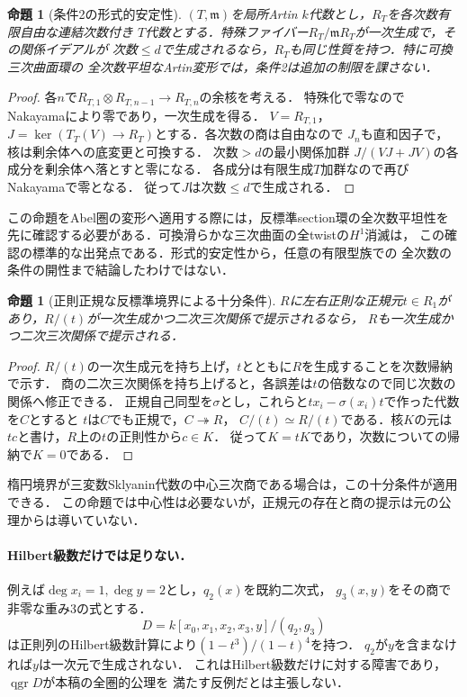 \documentclass[11pt,a4paper]{ltjsarticle}
\newtheorem{proposition}[theorem]{命題}
\theoremstyle{definition}\newtheorem{definition}[theorem]{定義}
\newcommand{\qgr}{\operatorname{qgr}}\newcommand{\Gr}{\operatorname{Gr}}
\begin{document}
\begin{proposition}[条件2の形式的安定性]\label{prop:artin}
$(T,\mathfrak m)$を局所Artin $k$代数とし，$R_T$を各次数有限自由な連結次数付き
$T$代数とする．特殊ファイバー$R_T/\mathfrak mR_T$が一次生成で，その関係イデアルが
次数$\le d$で生成されるなら，$R_T$も同じ性質を持つ．特に可換三次曲面環の
全次数平坦なArtin変形では，条件2は追加の制限を課さない．
\end{proposition}
\begin{proof}
各$n$で$R_{T,1}\otimes R_{T,n-1}\to R_{T,n}$の余核を考える．
特殊化で零なのでNakayamaにより零であり，一次生成を得る．
$V=R_{T,1}$，$J=\ker(T_T(V)\to R_T)$とする．各次数の商は自由なので
$J_n$も直和因子で，核は剰余体への底変更と可換する．
次数$>d$の最小関係加群
$J/(VJ+JV)$の各成分を剰余体へ落とすと零になる．
各成分は有限生成$T$加群なので再びNakayamaで零となる．
従って$J$は次数$\le d$で生成される．
\end{proof}
この命題をAbel圏の変形へ適用する際には，反標準section環の全次数平坦性を
先に確認する必要がある．可換滑らかな三次曲面の全twistの$H^1$消滅は，
この確認の標準的な出発点である．形式的安定性から，任意の有限型族での
全次数の条件の開性まで結論したわけではない．

\begin{proposition}[正則正規な反標準境界による十分条件]\label{prop:boundary}
$R$に左右正則な正規元$t\in R_1$があり，$R/(t)$が一次生成かつ二次三次関係で提示されるなら，
$R$も一次生成かつ二次三次関係で提示される．
\end{proposition}
\begin{proof}
$R/(t)$の一次生成元を持ち上げ，$t$とともに$R$を生成することを次数帰納で示す．
商の二次三次関係を持ち上げると，各誤差は$t$の倍数なので同じ次数の関係へ修正できる．
正規自己同型を$\sigma$とし，これらと$tx_i-\sigma(x_i)t$で作った代数を$C$とすると
$t$は$C$でも正規で，$C\twoheadrightarrow R$，
$C/(t)\simeq R/(t)$である．核$K$の元は$t c$と書け，$R$上の$t$の正則性から$c\in K$．
従って$K=tK$であり，次数についての帰納で$K=0$である．
\end{proof}
楕円境界が三変数Sklyanin代数の中心三次商である場合は，この十分条件が適用できる．
この命題では中心性は必要ないが，正規元の存在と商の提示は元の公理からは導いていない．

\paragraph{Hilbert級数だけでは足りない．}
例えば$\deg x_i=1,\deg y=2$とし，$q_2(x)$を既約二次式，
$g_3(x,y)$をその商で非零な重み3の式とする．
\[
 D=k[x_0,x_1,x_2,x_3,y]/(q_2,g_3)
\]
は正則列のHilbert級数計算により$(1-t^3)/(1-t)^4$を持つ．
$q_2$が$y$を含まなければ$y$は一次元で生成されない．
これはHilbert級数だけに対する障害であり，$\qgr D$が本稿の全圏的公理を
満たす反例だとは主張しない．
\end{document}
